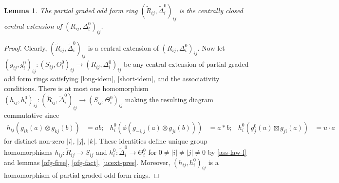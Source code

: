 \documentclass{article}
\newtheorem{lemma}{Lemma}
\theoremstyle{definition}
\begin{document}
\begin{lemma} \label{ucext}
    The partial graded odd form ring \(
        (
            \widetilde R_{ij},
            \widetilde \Delta^0_i
        )_{ij}
    \) is the centrally closed central extension of \(
        (R_{ij}, \Delta^0_i)_{ij}
    \).
\end{lemma}
\begin{proof}
    Clearly, \(
        (
            \widetilde R_{ij},
            \widetilde \Delta^0_i
        )_{ij}
    \) is a central extension of \(
        (R_{ij}, \Delta^0_i)_{ij}
    \). Now let \(
        (g_{ij}, g^0_i)_{ij}
        \colon (S_{ij}, \Theta^0_i)_{ij}
        \to (R_{ij}, \Delta^0_i)_{ij}
    \) be any central extension of partial graded odd form rings satisfying \ref{long-idem}, \ref{short-idem}, and the associativity conditions. There is at most one homomorphism \(
        (h_{ij}, h^0_i)_{ij}
        \colon (
            \widetilde R_{ij},
            \widetilde \Delta^0_i
        )_{ij} \to (S_{ij}, \Theta^0_i)_{ij}
    \) making the resulting diagram commutative since
    \begin{align*}
        h_{ij}(g_{ik}(a) \otimes g_{kj}(b)) &= ab;
        &
        h^0_i(\phi(
            g_{-i, j}(a) \otimes g_{ji}(b)
        ) ) &= a * b;
        &
        h^0_i(g^0_j(u) \boxtimes g_{ji}(a))
        &= u \cdot a
    \end{align*}
    for distinct non-zero \(|i|\), \(|j|\), \(|k|\). These identities define unique group homomorphisms \(
        h_{ij} \colon \widetilde R_{ij} \to S_{ij}
    \) and \(
        h^0_i \colon \widetilde \Delta^0_i \to \Theta^0_i
    \) for \(0 \neq |i| \neq |j| \neq 0\) by \ref{ass-law-l} and lemmas \ref{ofg-free}, \ref{ofg-fact}, \ref{ucext-pres}. Moreover, \(
        (h_{ij}, h^0_i)_{ij}
    \) is a homomorphism of partial graded odd form rings.
\end{proof}
\end{document}
